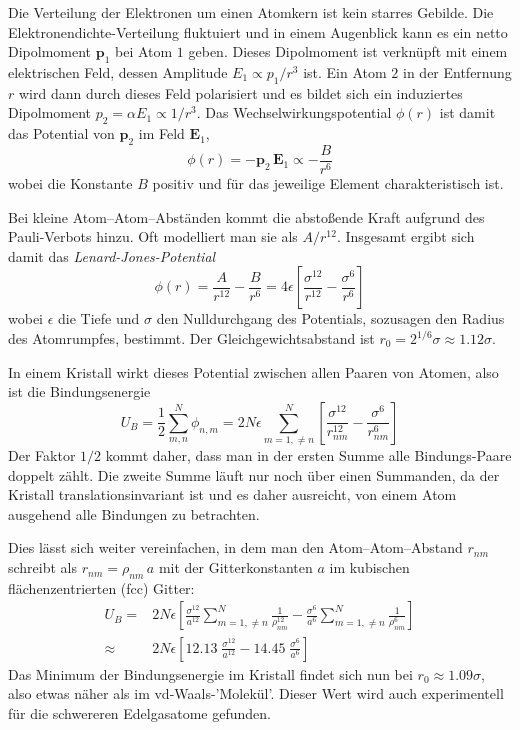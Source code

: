 Die Verteilung der Elektronen um einen Atomkern ist kein starres Gebilde. Die Elektronendichte-Verteilung fluktuiert und in einem Augenblick kann es ein netto Dipolmoment $\mathbf{p}_1$ bei Atom $1$ geben. Dieses Dipolmoment ist verknüpft mit einem elektrischen Feld, dessen Amplitude $E_1 \propto p_1 / r^3$ ist. Ein Atom $2$ in der Entfernung $r$ wird dann durch dieses Feld polarisiert und es bildet sich ein induziertes Dipolmoment $p_2 = \alpha E_1 \propto 1/r^3$. Das Wechselwirkungspotential $\phi(r)$ ist damit das Potential von $\mathbf{p}_2$ im Feld $\mathbf{E}_1$, 
\begin{equation}
 \phi(r) = - \mathbf{p}_2 \, \mathbf{E}_1 \propto - \frac{B}{r^6}
\end{equation}
wobei die Konstante $B$ positiv und für das jeweilige Element charakteristisch ist.

Bei kleine Atom--Atom--Abständen kommt die abstoßende Kraft aufgrund des Pauli-Verbots hinzu. Oft modelliert man sie als $A/r^{12}$. Insgesamt ergibt sich damit das \emph{Lenard-Jones-Potential}
\begin{equation}
\phi(r) = \frac{A}{r^{12}} - \frac{B}{r^{6}} = 4 \epsilon \left[ \frac{\sigma^{12}}{r^{12}} -  \frac{\sigma^{6}}{r^{6}} \right]
\end{equation}
wobei $\epsilon$ die Tiefe und $\sigma$ den Nulldurchgang des Potentials, sozusagen den Radius des Atomrumpfes, bestimmt. Der Gleichgewichtsabstand ist $r_0 = 2^{1/6} \sigma \approx 1.12 \sigma$.

In einem Kristall wirkt dieses Potential zwischen allen Paaren von Atomen, also ist die Bindungsenergie 
\begin{equation}
U_B = \frac{1}{2} \sum_{m,n}^N \phi_{n,m} = 
2 N \epsilon \sum_{m=1,   \neq n}^N 
\left[ 
\frac{\sigma^{12}}{r_{nm}^{12}} -  \frac{\sigma^6}{r_{nm}^{6}} 
\right]
\end{equation}
Der Faktor $1/2$ kommt daher, dass man in der ersten Summe alle Bindungs-Paare doppelt zählt. Die zweite Summe läuft nur noch über einen Summanden, da der Kristall translationsinvariant ist und es daher ausreicht, von einem Atom ausgehend alle Bindungen zu betrachten.

Dies lässt sich weiter vereinfachen, in dem man den Atom--Atom--Abstand $r_{nm}$ schreibt als $r_{nm} = \rho_{nm} \, a$  mit der Gitterkonstanten $a$ im kubischen flächenzentrierten (fcc) Gitter:
\begin{align}
U_B = & 
2 N \epsilon 
\left[ 
\frac{\sigma^{12}}{a^{12}}
\sum_{m=1,   \neq n}^N  \frac{1}{\rho_{nm}^{12}} 
-
\frac{\sigma^{6}}{a^{6}}
\sum_{m=1,   \neq n}^N  \frac{1}{\rho_{nm}^{6}} 
\right] \\
\approx & 
2 N \epsilon 
\left[ 
12.13 \; \frac{\sigma^{12}}{a^{12}}
-
14.45 \; \frac{\sigma^{6}}{a^{6}}
\right] 
\end{align}
Das Minimum der Bindungsenergie im Kristall findet sich nun bei $r_0 \approx 1.09 \sigma$, also etwas näher als im vd-Waals-'Molekül'. Dieser Wert wird auch experimentell für die schwereren Edelgasatome gefunden.

